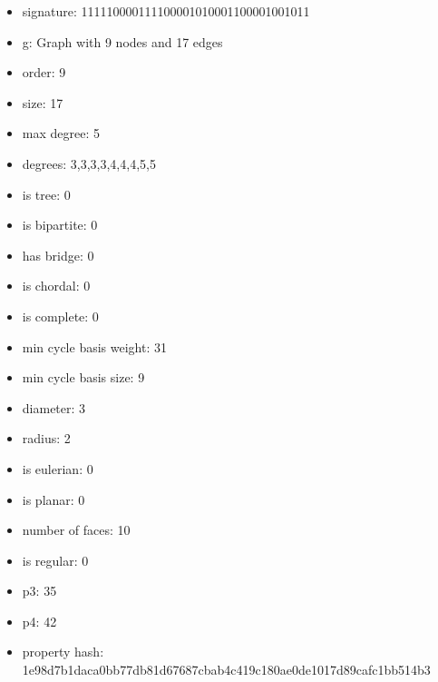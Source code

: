 \newpage
\begin{figure}
\end{figure}
\begin{itemize}
\item signature: 111110000111100001010001100001001011
\item g: Graph with 9 nodes and 17 edges
\item order: 9
\item size: 17
\item max degree: 5
\item degrees: 3,3,3,3,4,4,4,5,5
\item is tree: 0
\item is bipartite: 0
\item has bridge: 0
\item is chordal: 0
\item is complete: 0
\item min cycle basis weight: 31
\item min cycle basis size: 9
\item diameter: 3
\item radius: 2
\item is eulerian: 0
\item is planar: 0
\item number of faces: 10
\item is regular: 0
\item p3: 35
\item p4: 42
\item property hash: 1e98d7b1daca0bb77db81d67687cbab4c419c180ae0de1017d89cafc1bb514b3
\end{itemize}
